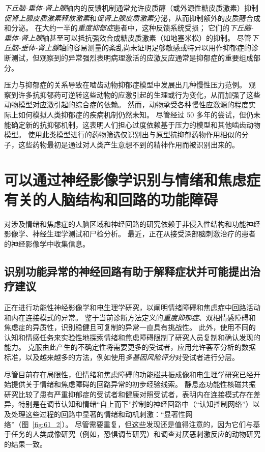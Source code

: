 \textit{下丘脑-垂体-肾上腺}轴内的反馈机制通常允许皮质醇（或外源性糖皮质激素）抑制\textit{促肾上腺皮质激素释放激素}和\textit{促肾上腺皮质激素}分泌，从而抑制额外的皮质醇合成和分泌。
在大约一半的\textit{重度抑郁症}患者中，这种反馈系统受损；
它们的\textit{下丘脑-垂体-肾上腺}轴甚至可以抵抗强效合成糖皮质激素（如地塞米松）的抑制。
尽管\textit{下丘脑-垂体-肾上腺}轴的容易测量的紊乱尚未证明足够敏感或特异以用作抑郁症的诊断测试，但观察到的异常强烈表明病理激活的应激反应通常是抑郁症的重要组成部分。


压力与抑郁症的关系导致在啮齿动物抑郁症模型中发展出几种慢性压力范例。
观察到许多抗抑郁药可逆转这些动物的应激引起的生理或行为变化，从而加强了这些动物模型对应激引起的综合症的依赖。
然而，动物承受各种慢性应激源的程度实际上如何模拟人类抑郁症的疾病机制仍然未知。
尽管经过 50 多年的尝试，但仍未能确定新的抗抑郁机制，这表明人们担心过度依赖基于压力的模型和其他啮齿动物模型。
使用此类模型进行的药物筛选仅识别出与原型抗抑郁药物作用相似的分子，这些药物最初是通过对人类产生意想不到的精神作用而被识别出来的。



\section{可以通过神经影像学识别与情绪和焦虑症有关的人脑结构和回路的功能障碍}

对涉及情绪和焦虑症的人脑区域和神经回路的研究依赖于非侵入性结构和功能神经影像学、神经生理学测试和尸检分析。
最近，正在从接受深部脑刺激治疗的患者的神经影像学中收集信息。



\subsection{识别功能异常的神经回路有助于解释症状并可能提出治疗建议}

正在进行功能性神经影像学和电生理学研究，以阐明情绪障碍和焦虑症中回路活动和内在连接模式的异常。
鉴于当前诊断方法定义的\textit{重度抑郁症}、双相情感障碍和焦虑症的异质性，识别稳健且可复制的异常一直具有挑战性。
此外，使用不同的认知和情感任务来实验性地探索情绪和焦虑障碍限制了研究人员复制和确认发现的能力。
克服由此产生的不确定性将需要更多的受试者，应用允许荟萃分析的数据标准，以及越来越多的方法，例如使用\textit{多基因风险评分}对受试者进行分层。


尽管目前存在局限性，但情绪和焦虑障碍的功能磁共振成像和电生理学研究已经开始提供关于情绪和焦虑障碍的回路异常的初步经验线索。
静息态功能性核磁共振研究比较了患有严重抑郁症的受试者和健康对照受试者，表明内在连接模式存在差异，特别是在调节认知和情绪“自上而下”控制的神经回路中（“认知控制网络”）以及处理这些过程的回路中显著的情绪和动机刺激：“显著性网络”（图~\ref{fig:61_2}）。
尽管需要重复，但这些发现还是值得注意的，因为它们与基于任务的人类成像研究（例如，恐惧调节研究）和调查对厌恶刺激反应的动物研究的结果一致。


